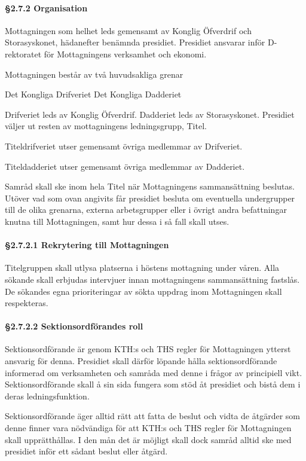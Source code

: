 \paragraph{§2.7.2 Organisation}

Mottagningen som helhet leds gemensamt av Konglig Öfverdrif och Storasyskonet, hädanefter benämnda presidiet. Presidiet ansvarar inför D-rektoratet för Mottagningens verksamhet och ekonomi.

Mottagningen består av två huvudsakliga grenar

Det Kongliga Drifveriet
Det Kongliga Dadderiet

Drifveriet leds av Konglig Öfverdrif. Dadderiet leds av Storasyskonet. Presidiet väljer ut resten av mottagningens ledningsgrupp, Titel.

Titeldrifveriet utser gemensamt övriga medlemmar av Drifveriet.

Titeldadderiet utser gemensamt övriga medlemmar av Dadderiet.

Samråd skall ske inom hela Titel när Mottagningens sammansättning beslutas. Utöver vad som ovan angivits får presidiet besluta om eventuella undergrupper till de olika grenarna, externa arbetsgrupper eller i övrigt andra befattningar knutna till Mottagningen, samt hur dessa i så fall skall utses.

\paragraph{§2.7.2.1 Rekrytering till Mottagningen}

Titelgruppen skall utlysa platserna i höstens mottagning under våren. Alla sökande skall erbjudas intervjuer innan mottagningens sammansättning fastslås. De sökandes egna prioriteringar av sökta uppdrag inom Mottagningen skall respekteras.

\paragraph{§2.7.2.2 Sektionsordförandes roll}

Sektionsordförande är genom KTH:s och THS regler för Mottagningen ytterst ansvarig för denna. Presidiet skall därför löpande hålla sektionsordförande informerad om verksamheten och samråda med denne i frågor av principiell vikt. Sektionsordförande skall å sin sida fungera som stöd åt presidiet och bistå dem i deras ledningsfunktion.

Sektionsordförande äger alltid rätt att fatta de beslut och vidta de åtgärder som denne finner vara nödvändiga för att KTH:s och THS regler för Mottagningen skall upprätthållas. I den mån det är möjligt skall dock samråd alltid ske med presidiet inför ett sådant beslut eller åtgärd.

